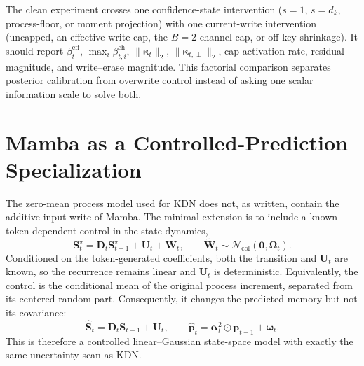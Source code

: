 \documentclass[11pt]{article}
\newcommand{\vct}[1]{\boldsymbol{#1}}
\begin{document}
The clean experiment crosses one confidence-state intervention
($s=1$, $s=d_k$, process-floor, or moment projection) with one current-write intervention
(uncapped, an effective-write cap, the $B=2$ channel cap, or off-key shrinkage). It should report
$\beta_t^{\mathrm{eff}}$, $\max_i\beta_{t,i}^{\mathrm{ch}}$,
$\|\vct{\kappa}_t\|_2$, $\|\vct{\kappa}_{t,\perp}\|_2$, cap activation rate, residual magnitude,
and write--erase magnitude. This factorial comparison separates posterior calibration from
overwrite control instead of asking one scalar information scale to solve both.

\section{Mamba as a Controlled-Prediction Specialization}
\label{sec:discussion-mamba-controlled-prediction}

The zero-mean process model used for KDN does not, as written, contain the additive input write of
Mamba. The minimal extension is to include a known token-dependent control in the state dynamics,
\begin{equation}
  \vct{S}_t^\star
  =\vct{D}_t\vct{S}_{t-1}^\star+\vct{U}_t+\widetilde{\vct{W}}_t,
  \qquad
  \widetilde{\vct{W}}_t
  \sim\mathcal{N}_{\mathrm{col}}(\vct{0},\vct{\Omega}_t).
  \label{eq:discussion-controlled-process}
\end{equation}
Conditioned on the token-generated coefficients, both the transition and $\vct{U}_t$ are known,
so the recurrence remains linear and $\vct{U}_t$ is deterministic. Equivalently, the control is
the conditional mean of the original process increment, separated from its centered random part.
Consequently, it changes the predicted memory but not its covariance:
\begin{equation}
  \widehat{\vct{S}}_t
  =\vct{D}_t\vct{S}_{t-1}+\vct{U}_t,
  \qquad
  \widehat{\vct{p}}_t
  =\vct{\alpha}_t^2\odot\vct{p}_{t-1}+\vct{\omega}_t.
  \label{eq:discussion-controlled-prediction}
\end{equation}
This is therefore a controlled linear--Gaussian state-space model with exactly the same
uncertainty scan as KDN.
\end{document}
